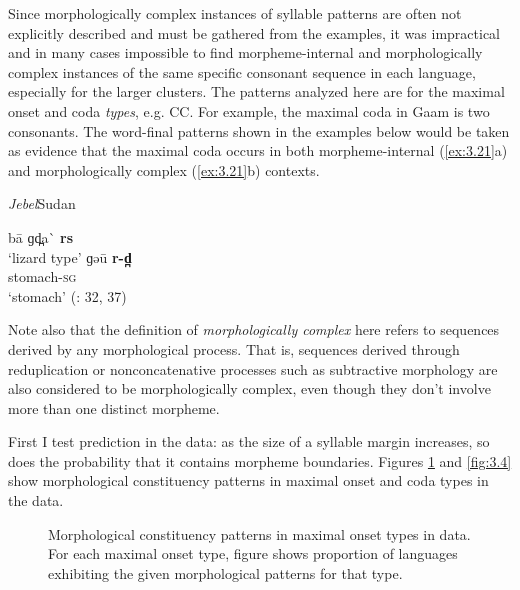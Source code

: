  Since morphologically complex instances of syllable patterns are often not explicitly described and must be gathered from the examples, it was impractical and in many cases impossible to find morpheme-internal and morphologically complex instances of the same specific consonant sequence in each language, especially for the larger clusters. The patterns analyzed here are for the maximal onset and coda \textit{types}, e.g. CC. For example, the maximal coda in Gaam is two consonants. The word-final patterns shown in the examples below would be taken as evidence that the maximal coda occurs in both morpheme-internal (\ref{ex:3.21}a) and morphologically complex (\ref{ex:3.21}b) contexts.

\ea\label{ex:3.21}
 \textit{Jebel}{Sudan}

\ea  ba\={} ɡd̪a\`{} \textbf{rs}\\
\glt ‘lizard type’
\ex  ɡəu\={} \textbf{r-d̪}\\
stomach-\textsc{sg}\\
\glt ‘stomach’
(\citealt{Stirtz2011}: 32, 37)
\z
\z

  Note also that the definition of \textit{morphologically complex} here refers to sequences derived by any morphological process. That is, sequences derived through reduplication or nonconcatenative processes such as subtractive morphology are also considered to be morphologically complex, even though they don’t involve more than one distinct morpheme.

  First I test  prediction in the data: as the size of a syllable margin increases, so does the probability that it contains morpheme boundaries. Figures \ref{fig:3.3} and \ref{fig:3.4} show morphological constituency patterns in maximal onset and coda types in the data.

  
\begin{figure}
\caption{\label{fig:3.3}Morphological constituency patterns in maximal onset types in data. For each maximal onset type, figure shows proportion of languages exhibiting the given morphological patterns for that type.}
\end{figure}


